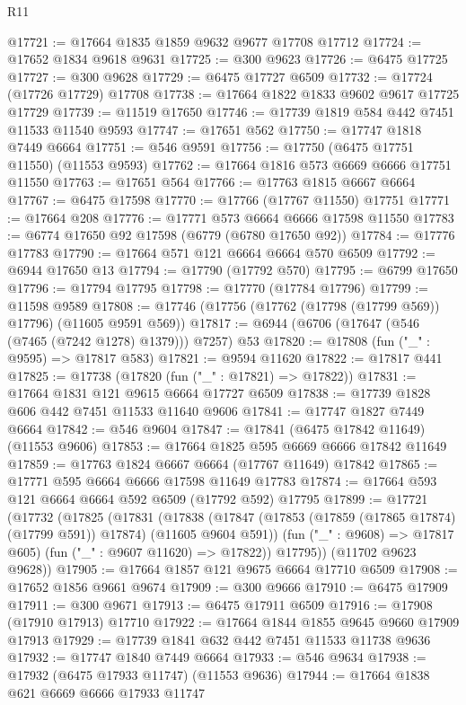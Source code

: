 \begin{lexlean}{R11}
\begin{coremodule}
@17721 := @17664 @1835 @1859 @9632 @9677 @17708 @17712
@17724 := @17652 @1834 @9618 @9631
@17725 := @300 @9623
@17726 := @6475 @17725
@17727 := @300 @9628
@17729 := @6475 @17727 @6509
@17732 := @17724 (@17726 @17729) @17708
@17738 := @17664 @1822 @1833 @9602 @9617 @17725 @17729
@17739 := @11519 @17650
@17746 := @17739 @1819 @584 @442 @7451 @11533 @11540 @9593
@17747 := @17651 @562
@17750 := @17747 @1818 @7449 @6664
@17751 := @546 @9591
@17756 := @17750 (@6475 @17751 @11550) (@11553 @9593)
@17762 := @17664 @1816 @573 @6669 @6666 @17751 @11550
@17763 := @17651 @564
@17766 := @17763 @1815 @6667 @6664
@17767 := @6475 @17598
@17770 := @17766 (@17767 @11550) @17751
@17771 := @17664 @208
@17776 := @17771 @573 @6664 @6666 @17598 @11550
@17783 := @6774 @17650 @92 @17598 (@6779 (@6780 @17650 @92))
@17784 := @17776 @17783
@17790 := @17664 @571 @121 @6664 @6664 @570 @6509
@17792 := @6944 @17650 @13
@17794 := @17790 (@17792 @570)
@17795 := @6799 @17650
@17796 := @17794 @17795
@17798 := @17770 (@17784 @17796)
@17799 := @11598 @9589
@17808 := @17746 (@17756 (@17762 (@17798 (@17799 @569)) @17796) (@11605 @9591 @569))
@17817 := @6944 (@6706 (@17647 (@546 (@7465 (@7242 @1278) @1379))) @7257) @53
@17820 := @17808 (fun ("_" : @9595) => @17817 @583)
@17821 := @9594 @11620
@17822 := @17817 @441
@17825 := @17738 (@17820 (fun ("_" : @17821) => @17822))
@17831 := @17664 @1831 @121 @9615 @6664 @17727 @6509
@17838 := @17739 @1828 @606 @442 @7451 @11533 @11640 @9606
@17841 := @17747 @1827 @7449 @6664
@17842 := @546 @9604
@17847 := @17841 (@6475 @17842 @11649) (@11553 @9606)
@17853 := @17664 @1825 @595 @6669 @6666 @17842 @11649
@17859 := @17763 @1824 @6667 @6664 (@17767 @11649) @17842
@17865 := @17771 @595 @6664 @6666 @17598 @11649 @17783
@17874 := @17664 @593 @121 @6664 @6664 @592 @6509 (@17792 @592) @17795
@17899 := @17721
    (@17732
      (@17825
        (@17831
          (@17838
            (@17847 (@17853 (@17859 (@17865 @17874) (@17799 @591)) @17874) (@11605 @9604 @591))
            (fun ("_" : @9608) => @17817 @605)
            (fun ("_" : @9607 @11620) => @17822))
          @17795))
      (@11702 @9623 @9628))
@17905 := @17664 @1857 @121 @9675 @6664 @17710 @6509
@17908 := @17652 @1856 @9661 @9674
@17909 := @300 @9666
@17910 := @6475 @17909
@17911 := @300 @9671
@17913 := @6475 @17911 @6509
@17916 := @17908 (@17910 @17913) @17710
@17922 := @17664 @1844 @1855 @9645 @9660 @17909 @17913
@17929 := @17739 @1841 @632 @442 @7451 @11533 @11738 @9636
@17932 := @17747 @1840 @7449 @6664
@17933 := @546 @9634
@17938 := @17932 (@6475 @17933 @11747) (@11553 @9636)
@17944 := @17664 @1838 @621 @6669 @6666 @17933 @11747

\end{coremodule}
\end{lexlean}
